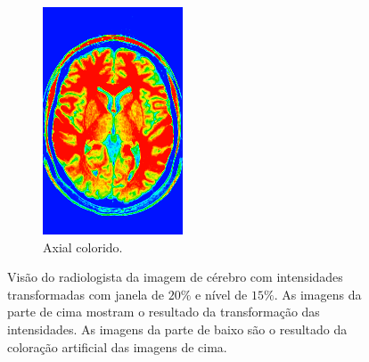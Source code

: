 \documentclass{article}
\begin{document}
\begin{figure}[H]
\begin{subfigure}[b]{0.3\textwidth}
        \includegraphics[width=\textwidth]{brain/radiologist-axial.png}
        \caption{Axial colorido.}
    \end{subfigure}
    \caption{Visão do radiologista da imagem de cérebro com intensidades transformadas com janela de $20\%$ e nível de $15\%$. As imagens da parte de cima mostram o resultado da transformação das intensidades. As imagens da parte de baixo são o resultado da coloração artificial das imagens de cima.}
    \label{fig:brain-visao-radiologista-cores}
\end{figure}
\end{document}
